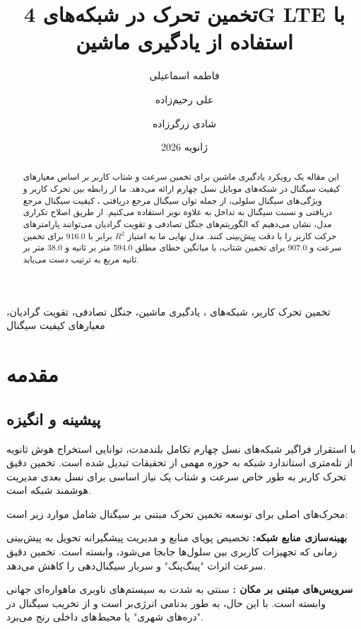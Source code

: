\documentclass{CSICC}
\title{
تخمین تحرک در شبکه‌های 4G LTE با استفاده از یادگیری ماشین
}
\author[1]{فاطمه اسماعیلی}
\author[2]{علی رحیم‌زاده}
\author[3]{شادی زرگرزاده}
\affil{
دانشگاه علم و صنعت ایران، دانشکده مهندسی کامپیوتر،\\
\lr{esmaeli@comp.iust.ac.ir},
\lr{rahimzadeh@comp.iust.ac.ir},
\lr{alizargar@comp.iust.ac.ir}
}
\date{ژانویه 2026}
\begin{document}
\maketitle
\begin{abstract}
این مقاله یک رویکرد یادگیری ماشین برای تخمین سرعت و شتاب کاربر بر اساس معیارهای کیفیت سیگنال در شبکه‌های موبایل نسل چهارم  ارائه می‌دهد. ما از رابطه بین تحرک کاربر و ویژگی‌های سیگنال سلولی، از جمله توان سیگنال مرجع دریافتی ، کیفیت سیگنال مرجع دریافتی  و نسبت سیگنال به تداخل به علاوه نویز  استفاده می‌کنیم. از طریق اصلاح تکراری مدل، نشان می‌دهیم که الگوریتم‌های جنگل تصادفی و تقویت گرادیان می‌توانند پارامترهای حرکت کاربر را با دقت پیش‌بینی کنند. مدل نهایی ما به امتیاز \(R^{2}\) برابر با 916.0 برای تخمین سرعت و 907.0 برای تخمین شتاب، با میانگین خطای مطلق 594.0 متر بر ثانیه و 38.0 متر بر ثانیه مربع به ترتیب دست می‌یابد.
\end{abstract}

\begin{keywords}
تخمین تحرک کاربر، شبکه‌های ، یادگیری ماشین، جنگل تصادفی، تقویت گرادیان، معیارهای کیفیت سیگنال
\end{keywords}

\section{مقدمه}

\subsection{پیشینه و انگیزه}
با استقرار فراگیر شبکه‌های نسل چهارم  تکامل بلندمدت، توانایی استخراج هوش ثانویه از تله‌متری استاندارد شبکه به حوزه مهمی از تحقیقات تبدیل شده است. تخمین دقیق تحرک کاربر به طور خاص سرعت و شتاب یک نیاز اساسی برای نسل بعدی مدیریت هوشمند شبکه است.

محرک‌های اصلی برای توسعه تخمین تحرک مبتنی بر سیگنال شامل موارد زیر است:

\textbf{بهینه‌سازی منابع شبکه:} تخصیص پویای منابع و مدیریت پیشگیرانه تحویل به پیش‌بینی زمانی که تجهیزات کاربری  بین سلول‌ها جابجا می‌شود، وابسته است. تخمین دقیق سرعت اثرات "پینگ‌پنگ" و سربار سیگنال‌دهی را کاهش می‌دهد.

\textbf{سرویس‌های مبتنی بر مکان :}  سنتی به شدت به سیستم‌های ناوبری ماهواره‌ای جهانی  وابسته است. با این حال،  به طور بدنامی انرژی‌بر است و از تخریب سیگنال در "دره‌های شهری" یا محیط‌های داخلی رنج می‌برد.
\end{document}
